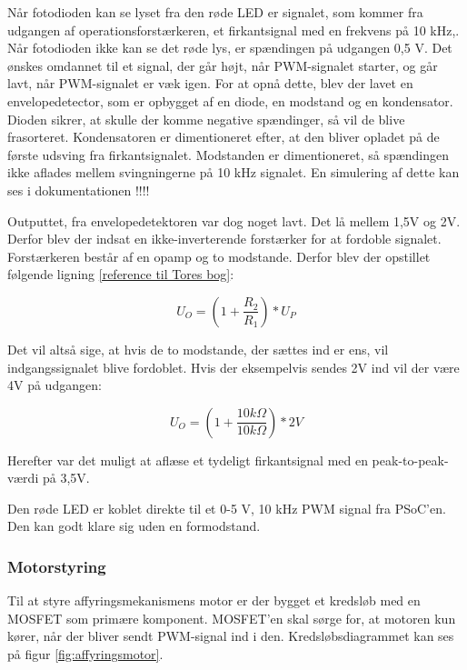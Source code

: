 Når fotodioden kan se lyset fra den røde LED er signalet, som kommer fra udgangen af operationsforstærkeren, et firkantsignal med en frekvens på 10 kHz,. Når fotodioden ikke kan se det røde lys, er spændingen på udgangen 0,5 V. Det ønskes omdannet til et signal, der går højt, når PWM-signalet starter, og går lavt, når PWM-signalet er væk igen. For at opnå dette, blev der lavet en envelopedetector, som er opbygget af en diode, en modstand og en kondensator. Dioden sikrer, at skulle der komme negative spændinger, så vil de blive frasorteret. Kondensatoren er dimentioneret efter, at den bliver opladet på de første udsving fra firkantsignalet. Modstanden er dimentioneret, så spændingen ikke aflades mellem svingningerne på 10 kHz signalet. En simulering af dette kan ses i dokumentationen !!!! 

Outputtet, fra envelopedetektoren var dog noget lavt. Det lå mellem 1,5V og 2V. Derfor blev der indsat en ikke-inverterende forstærker for at fordoble signalet. Forstærkeren består af en opamp og to modstande. Derfor blev der opstillet følgende ligning \ref{reference til Tores bog}: 

\begin{equation} 
	U_{O}=(1+\frac{R_{2}}{R_{1}})*U_{P}
\end{equation}

Det vil altså sige, at hvis de to modstande, der sættes ind er ens, vil indgangssignalet blive fordoblet. Hvis der eksempelvis sendes 2V ind vil der være 4V på udgangen: 

\begin{equation}
	U_{O}=(1+\frac{10k\Omega}{10k\Omega})*2V
\end{equation}

Herefter var det muligt at aflæse et tydeligt firkantsignal med en peak-to-peak-værdi på 3,5V. 

Den røde LED er koblet direkte til et 0-5 V, 10 kHz PWM signal fra PSoC'en. Den kan godt klare sig uden en formodstand. 

\subsubsection{Motorstyring}
Til at styre affyringsmekanismens motor er der bygget et kredsløb med en MOSFET som primære komponent. MOSFET'en skal sørge for, at motoren kun kører, når der bliver sendt PWM-signal ind i den. Kredsløbsdiagrammet kan ses på figur \ref{fig:affyringsmotor}. 

